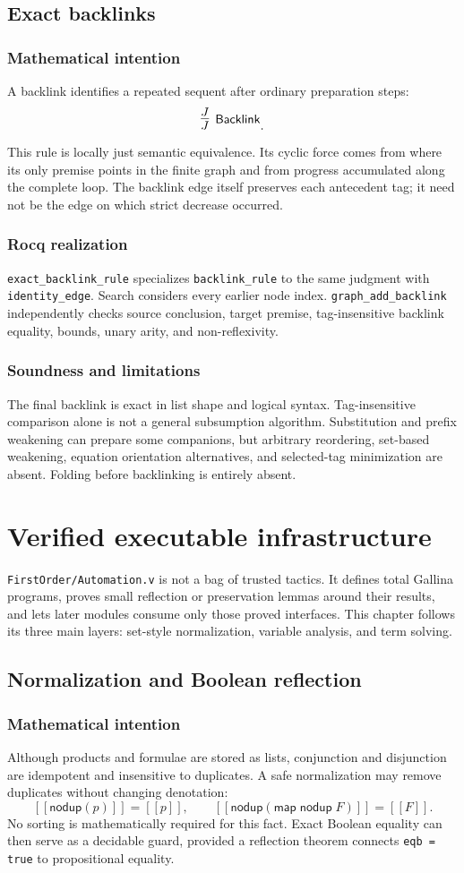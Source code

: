 \documentclass[11pt,oneside]{book}
\DeclareRobustCommand{\code}[1]{\nolinkurl{#1}}
\DeclareRobustCommand{\file}[1]{\nolinkurl{#1}}
\newcommand{\sem}[1]{[\![#1]\!]}
\newcommand{\mathintent}{\subsection*{Mathematical intention}}
\newcommand{\rocqreal}{\subsection*{Rocq realization}}
\newcommand{\soundlim}{\subsection*{Soundness and limitations}}
\begin{document}
\section{Exact backlinks}

\mathintent

A backlink identifies a repeated sequent after ordinary preparation steps:
\[
 \infer[\mathsf{Backlink}]{J}{J}.
\]
This rule is locally just semantic equivalence.  Its cyclic force comes from
where its only premise points in the finite graph and from progress accumulated
along the complete loop.  The backlink edge itself preserves each antecedent
tag; it need not be the edge on which strict decrease occurred.

\rocqreal

\code{exact_backlink_rule} specializes \code{backlink_rule} to the same
judgment with \code{identity_edge}.  Search considers every earlier node index.
\code{graph_add_backlink} independently checks source conclusion, target
premise, tag-insensitive backlink equality, bounds, unary arity, and
non-reflexivity.

\soundlim

The final backlink is exact in list shape and logical syntax.  Tag-insensitive
comparison alone is not a general subsumption algorithm.  Substitution and
prefix weakening can prepare some companions, but arbitrary reordering,
set-based weakening, equation orientation alternatives, and selected-tag
minimization are absent.  Folding before backlinking is entirely absent.

\chapter{Verified executable infrastructure}
\label{ch:automation}

\file{FirstOrder/Automation.v} is not a bag of trusted tactics.  It defines
total Gallina programs, proves small reflection or preservation lemmas around
their results, and lets later modules consume only those proved interfaces.
This chapter follows its three main layers: set-style normalization, variable
analysis, and term solving.

\section{Normalization and Boolean reflection}

\mathintent

Although products and formulae are stored as lists, conjunction and disjunction
are idempotent and insensitive to duplicates.  A safe normalization may remove
duplicates without changing denotation:
\[
 \sem{\mathsf{nodup}(p)}=\sem p,
 \qquad
 \sem{\mathsf{nodup}(\mathsf{map}\;\mathsf{nodup}\;F)}=\sem F.
\]
No sorting is mathematically required for this fact.  Exact Boolean equality
can then serve as a decidable guard, provided a reflection theorem connects
\code{eqb = true} to propositional equality.
\end{document}
